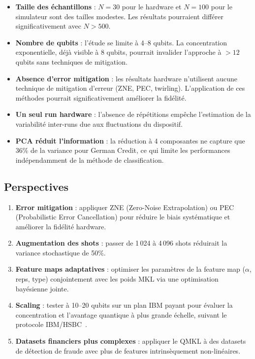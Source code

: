 \documentclass[12pt,a4paper]{article}
\begin{document}
\begin{itemize}
    \item \textbf{Taille des échantillons} : $N = 30$ pour le hardware et $N = 100$ pour le simulateur sont des tailles modestes. Les résultats pourraient différer significativement avec $N > 500$.

    \item \textbf{Nombre de qubits} : l'étude se limite à 4--8 qubits. La concentration exponentielle, déjà visible à 8 qubits, pourrait invalider l'approche à $> 12$ qubits sans techniques de mitigation.

    \item \textbf{Absence d'error mitigation} : les résultats hardware n'utilisent aucune technique de mitigation d'erreur (ZNE, PEC, twirling). L'application de ces méthodes pourrait significativement améliorer la fidélité.

    \item \textbf{Un seul run hardware} : l'absence de répétitions empêche l'estimation de la variabilité inter-runs due aux fluctuations du dispositif.

    \item \textbf{PCA réduit l'information} : la réduction à 4 composantes ne capture que 36\% de la variance pour German Credit, ce qui limite les performances indépendamment de la méthode de classification.
\end{itemize}

\subsection{Perspectives}

\begin{enumerate}
    \item \textbf{Error mitigation} : appliquer ZNE (Zero-Noise Extrapolation) ou PEC (Probabilistic Error Cancellation) pour réduire le biais systématique et améliorer la fidélité hardware.

    \item \textbf{Augmentation des shots} : passer de 1\,024 à 4\,096 shots réduirait la variance stochastique de 50\%.

    \item \textbf{Feature maps adaptatives} : optimiser les paramètres de la feature map ($\alpha$, reps, type) conjointement avec les poids MKL via une optimisation bayésienne jointe.

    \item \textbf{Scaling} : tester à 10--20 qubits sur un plan IBM payant pour évaluer la concentration et l'avantage quantique à plus grande échelle, suivant le protocole IBM/HSBC~\cite{ibm2023}.

    \item \textbf{Datasets financiers plus complexes} : appliquer le QMKL à des datasets de détection de fraude avec plus de features intrinsèquement non-linéaires.
\end{enumerate}
\end{document}

